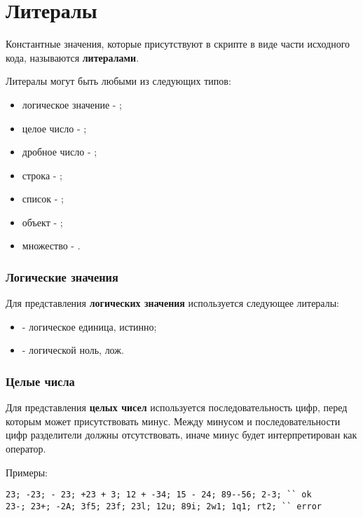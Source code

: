 \documentclass[a4paper, 14pt]{extarticle}
\newenvironment{icItems}
	{ \begin{itemize} [noitemsep,nolistsep] }
	{ \end{itemize} }
\begin{document}
\newpage
\section{Литералы}
	
Константные значения, которые присутствуют в скрипте в виде части исходного кода, называются {\bf литералами}.

Литералы могут быть любыми из следующих типов:

\begin{icItems}
	\item логическое значение - ;
	\item целое число - ;
	\item дробное число - ;
	\item строка - ;
	\item список - ;
	\item объект - ;
	\item множество - .
\end{icItems}

\subsubsection{Логические значения}

Для представления {\bf логических значения} используется следующее литералы:
\begin{icItems}
	\item {} - логическое единица, истинно;
	\item {} - логической ноль, лож.
\end{icItems}

\subsubsection{Целые числа}

Для представления {\bf целых чисел} используется последовательность цифр, перед которым может присутствовать минус. Между минусом и последовательности цифр разделители должны отсутствовать, иначе минус будет интерпретирован как оператор.
	
\noindent Примеры:
\begin{lstlisting}[numbers=none]
23; -23; - 23; +23 + 3; 12 + -34; 15 - 24; 89--56; 2-3; `` ok
23-; 23+; -2А; 3f5; 23f; 23l; 12u; 89i; 2w1; 1q1; rt2; `` error 
\end{lstlisting}
	
\end{document}
